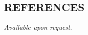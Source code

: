 \documentclass[margin, 10pt]{style/res} %
\begin{document}
\begin{resume}




\section{\small{REFERENCES}}

{\sl Available upon request}.

%
%





\end{resume}
\end{document}
